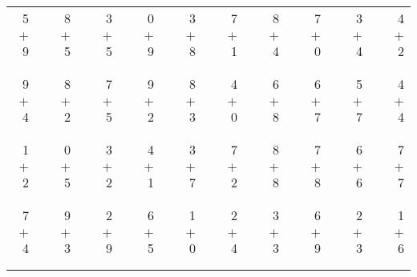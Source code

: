 \documentclass[12pt, letterpaper]{article}
\begin{document}
\begin{tabular}{rrrrrrrrrrrrrrrrrrr}
5 & & 8 & & 3 & & 0 & & 3 & & 7 & & 8 & & 7 & & 3 & & 4\\
$+$ 9 & & $+$ 5 & & $+$ 5 & & $+$ 9 & & $+$ 8 & & $+$ 1 & & $+$ 4 & & $+$ 0 & & $+$ 4 & & $+$ 2\\
\cline{1-1} \cline{3-3} \cline{5-5} \cline{7-7} \cline{9-9} \cline{11-11} \cline{13-13} \cline{15-15} \cline{17-17} \cline{19-19} \\ \\
9 & & 8 & & 7 & & 9 & & 8 & & 4 & & 6 & & 6 & & 5 & & 4\\
$+$ 4 & & $+$ 2 & & $+$ 5 & & $+$ 2 & & $+$ 3 & & $+$ 0 & & $+$ 8 & & $+$ 7 & & $+$ 7 & & $+$ 4\\
\cline{1-1} \cline{3-3} \cline{5-5} \cline{7-7} \cline{9-9} \cline{11-11} \cline{13-13} \cline{15-15} \cline{17-17} \cline{19-19} \\ \\
1 & & 0 & & 3 & & 4 & & 3 & & 7 & & 8 & & 7 & & 6 & & 7\\
$+$ 2 & & $+$ 5 & & $+$ 2 & & $+$ 1 & & $+$ 7 & & $+$ 2 & & $+$ 8 & & $+$ 8 & & $+$ 6 & & $+$ 7\\
\cline{1-1} \cline{3-3} \cline{5-5} \cline{7-7} \cline{9-9} \cline{11-11} \cline{13-13} \cline{15-15} \cline{17-17} \cline{19-19} \\ \\
7 & & 9 & & 2 & & 6 & & 1 & & 2 & & 3 & & 6 & & 2 & & 1\\
$+$ 4 & & $+$ 3 & & $+$ 9 & & $+$ 5 & & $+$ 0 & & $+$ 4 & & $+$ 3 & & $+$ 9 & & $+$ 3 & & $+$ 6\\
\cline{1-1} \cline{3-3} \cline{5-5} \cline{7-7} \cline{9-9} \cline{11-11} \cline{13-13} \cline{15-15} \cline{17-17} \cline{19-19} \\ \\
\end{tabular}
\newpage
\end{document}
